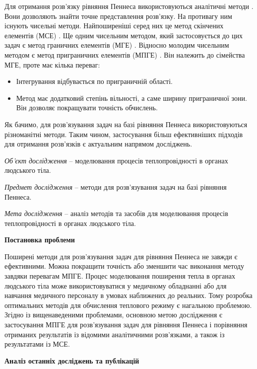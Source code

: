 Для отримання розв'язку рівняння Пеннеса використовуються аналітичні методи \cite{trefilov2025generalizedbioheat}. Вони
дозволяють знайти точне представлення розв'язку. На противагу ним існують чисельні методи. Найпоширеніші серед них це 
метод скінчених елементів (МСЕ) \cite{bahvalov-et-al}. Ще одним чисельним методом, який застосовується до цих задач є
метод граничних елементів (МГЕ) \cite{brebbia-bem}. Відносно молодим чисельним методом є метод приграничних елементів 
(МПГЕ) \cite{grytsko-cobem}. Він належить до сімейства МГЕ, проте має кілька переваг: 
\begin{itemize}
  \item Інтегрування відбувається по приграничній області.
  \item Метод має додатковий степінь вільності, а саме ширину приграничної зони. Він дозволяє покращувати точність 
  обчислень.
\end{itemize}
Як бачимо, для розв'язування задач на базі рівняння Пеннеса використовуються різноманітні методи. Таким чином, 
застосування більш ефективніших підходів для отримання розв'язків є актуальним напрямом досліджень. 

\textit{Об’єкт дослідження} -- моделювання процесів теплопровідності в органах людського тіла. 

\textit{Предмет дослідження} -- методи для розв'язування задач на базі рівняння Пеннеса. 

\textit{Мета дослідження} -- аналіз методів та засобів для моделювання процесів теплопровідності в органах людського
тіла.

\begin{center}
    \textbf{Постановка проблеми}
\end{center}

Поширені методи для розв'язування задач для рівняння Пеннеса не завжди є ефективними. Можна покращити точність або 
зменшити час виконання методу завдяки перевагам МПГЕ. Процес моделювання поширення тепла в органах людського тіла може
використовуватися у медичному обладнанні або для навчання медичного персоналу в умовах наближених до реальних. Тому 
розробка оптимальних методів для обчислення теплового режиму є нагальною проблемою.
Згідно із вищенаведеними проблемами, основною метою дослідження є застосування МПГЕ для розв'язування задач для рівняння
Пеннеса і порівняння отриманих результатів із відомими аналітичними розв'язками, а також із результатами із МСЕ.   

\begin{center}
  \textbf{Аналіз останніх досліджень та публікацій}
\end{center}

